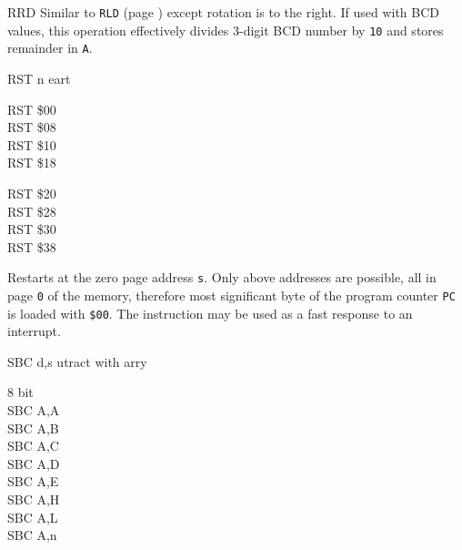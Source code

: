 \documentclass[12pt,twoside,openright,a4paper]{book}
\begin{document}
\begin{basedescript}{
	\desclabelstyle{\multilinelabel}
	\desclabelwidth{3cm}}
\begin{DetailItem}{RRD}
		Similar to {\tt RLD} (page \pageref{DetailRefRLD}) except rotation is to the right. If used with BCD values, this operation effectively divides 3-digit BCD number by {\tt 10} and stores remainder in {\tt A}.

		\begin{DetailEffects}[p]
		\end{DetailEffects}
						
		\begin{DetailTiming}
		\end{DetailTiming}

	\end{DetailItem}

	\begin{DetailItem}{RST n}
		{e\IH{ST}art}
		{\SymRST{n}}

		\begin{DetailVariants}
			RST \$00\\
			RST \$08\\
			RST \$10\\
			RST \$18
			
			\columnbreak
			RST \$20\\
			RST \$28\\
			RST \$30\\
			RST \$38
		\end{DetailVariants}

		Restarts at the zero page address {\tt s}. Only above addresses are possible, all in page {\tt 0} of the memory, therefore most significant byte of the program counter {\tt PC} is loaded with {\tt \$00}. The instruction may be used as a fast response to an interrupt.

		\DetailNoEffect
						
		\begin{DetailTiming}
			\DetailTime{}{3}{11}
		\end{DetailTiming}

	\end{DetailItem}

	\pagebreak
	\begin{DetailItem}{SBC d,s}
		{utract with arry}
		{\SymSBC{d}{s}}
	
		\begin{DetailVariants}
			\textnormal{8 bit}\\
			SBC A,A\\
			SBC A,B\\
			SBC A,C\\
			SBC A,D\\
			SBC A,E\\
			SBC A,H\\
			SBC A,L\\
			SBC A,n


\end{DetailVariants}
\end{DetailItem}
\end{basedescript}
\end{document}
